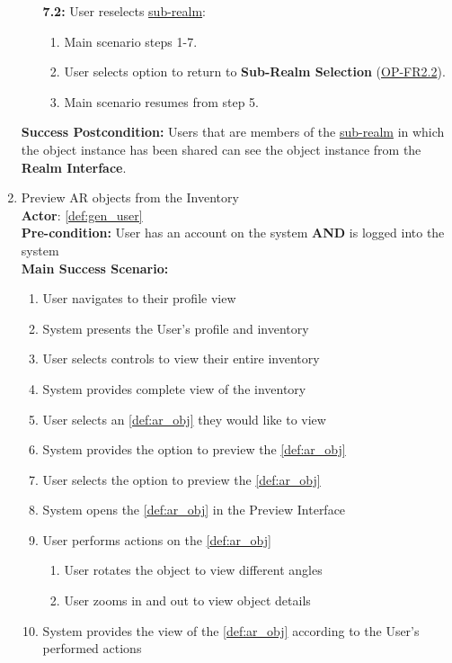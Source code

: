 \documentclass{article}
\begin{document}
\begin{enumerate}[label=\textbf{UC\arabic*}]
\begin{itemize}
              \item[{\bf 7.2:}] User reselects \hyperref[def:sub_realm]{sub-realm}:
                    \begin{enumerate}[label=\textbf{\arabic*.}]
                        \item Main scenario steps 1-7.
                        \item User selects option to return to \textbf{Sub-Realm Selection} (\hyperref[ssub:object_placement]{OP-FR2.2}).
                        \item Main scenario resumes from step 5.
                    \end{enumerate}
          \end{itemize}

          \textbf{Success Postcondition:} Users that are members of the \hyperref[def:sub_realm]{sub-realm} in which the object instance has been shared can see the object instance from the \textbf{Realm Interface}.

    \item \label{uc:9} Preview AR objects from the Inventory \\
          \textbf{Actor}: \ref{def:gen_user} \\
          \textbf{Pre-condition:} User has an account on the system \textbf{AND} is logged into the system \\

          \textbf{Main Success Scenario:}
          \begin{enumerate}[label=\textbf{\arabic*.}]
              \item User navigates to their profile view
              \item System presents the User's profile and inventory
              \item User selects controls to view their entire inventory
              \item System provides complete view of the inventory
              \item User selects an \ref{def:ar_obj} they would like to view
              \item System provides the option to preview the \ref{def:ar_obj}
              \item User selects the option to preview the \ref{def:ar_obj}
              \item System opens the \ref{def:ar_obj} in the Preview Interface
              \item User performs actions on the \ref{def:ar_obj}
                    \begin{enumerate}[label=(\alph*)]
                        \item User rotates the object to view different angles
                        \item User zooms in and out to view object details
                    \end{enumerate}
              \item System provides the view of the \ref{def:ar_obj} according to the User's performed actions
          \end{enumerate}


\end{enumerate}
\end{document}
